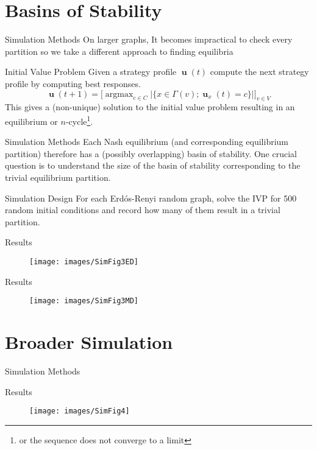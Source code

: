 \documentclass{beamer}
\DeclareMathOperator*{\argmax}{\text{argmax}}
\DeclareMathOperator{\uu}{\mathbf{u}}
\begin{document}
\section{Basins of Stability}
\begin{frame}{Simulation Methods}
	On larger graphs, It becomes impractical to check every partition so we take a different approach to finding equilibria
	\begin{block}{Initial Value Problem}
		Given a strategy profile $\uu(t)$ compute the next strategy profile by computing best responses.
		\begin{equation*}
			\uu(t+1)=\big[\argmax_{c\in C}|\{x\in\Gamma(v); \uu_x(t)=c\} |]_{v\in V}
		\end{equation*}
		This gives a (non-unique) solution to the initial value problem resulting in an equilibrium or $n$-cycle\footnote{or the sequence does not converge to a limit}.
	\end{block}
\end{frame}
\begin{frame}{Simulation Methods}
	Each Nash equilibrium (and corresponding equilibrium partition) therefore has a (possibly overlapping) basin of stability. One crucial question is to understand the size of the basin of stability corresponding to the trivial equilibrium partition. 
	\begin{block}{Simulation Design}
		For each Erd\'os-Renyi random graph, solve the IVP for 500 random initial conditions and record how many of them result in a trivial partition. 
	\end{block}
\end{frame}
\begin{frame}{Results}
	\begin{figure}
		\centering
		\texttt{[image: images/SimFig3ED]}
	\end{figure}
\end{frame}
\begin{frame}{Results}
	\begin{figure}
		\centering
		\texttt{[image: images/SimFig3MD]}
	\end{figure}
	\end{frame}
\section{Broader Simulation}
\begin{frame}{Simulation Methods}
	
\end{frame}
\begin{frame}{Results}
		\begin{figure}
		\centering
		\texttt{[image: images/SimFig4]}
	\end{figure}
\end{frame}
\end{document}
